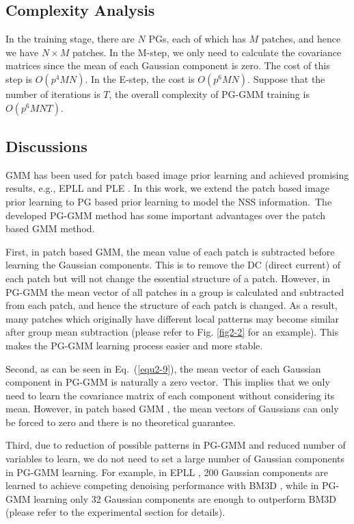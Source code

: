 \subsection{Complexity Analysis}
In the training stage, there are $N$ PGs, each of which has $M$ patches, and hence we have $N\times M$ patches. In the M-step, we only need to calculate the covariance matrices since the mean of each Gaussian component is zero. The cost of this step is $O(p^{4}MN)$. In the E-step, the cost is $O(p^{6}MN)$. Suppose that the number of iterations is $T$, the overall complexity of PG-GMM training is $O(p^{6}MNT)$.
\subsection{Discussions}
GMM has been used for patch based image prior learning and achieved promising results, e.g., EPLL \cite{epll} and PLE \cite{ple}. In this work, we extend the patch based image prior learning to PG based prior learning to model the NSS information.\ The developed PG-GMM method has some important advantages over the patch based GMM method.

First, in patch based GMM, the mean value of each patch is subtracted before learning the Gaussian components. This is to remove the DC (direct current) of each patch but will not change the essential structure of a patch. However, in PG-GMM the mean vector of all patches in a group is calculated and subtracted from each patch, and hence the structure of each patch is changed. As a result, many patches which originally have different local patterns may become similar after group mean subtraction (please refer to Fig. \ref{fig2-2} for an example). This makes the PG-GMM learning process easier and more stable. 

Second, as can be seen in Eq.\ (\ref{equ2-9}), the mean vector of each Gaussian component in PG-GMM is naturally a zero vector.\ This implies that we only need to learn the covariance matrix of each component without considering its mean. However, in patch based GMM \cite{epll}, the mean vectors of Gaussians can only be forced to zero and there is no theoretical guarantee.

Third, due to reduction of possible patterns in PG-GMM and reduced number of variables to learn, we do not need to set a large number of Gaussian components in PG-GMM learning. For example, in EPLL \cite{epll}, 200 Gaussian components are learned to achieve competing denoising performance with BM3D \cite{bm3d}, while in PG-GMM learning only 32 Gaussian components are enough to outperform BM3D (please refer to the experimental section for details).
